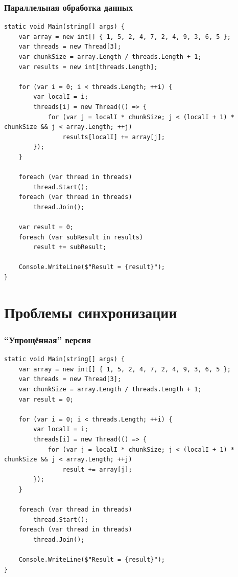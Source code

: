 \documentclass[xetex,mathserif,serif]{beamer}
\begin{document}
	\begin{frame}[fragile]
		\frametitle{Параллельная обработка данных}
		\begin{ssmall}
			\begin{verbatim}
static void Main(string[] args) {
    var array = new int[] { 1, 5, 2, 4, 7, 2, 4, 9, 3, 6, 5 };
    var threads = new Thread[3];
    var chunkSize = array.Length / threads.Length + 1;
    var results = new int[threads.Length];

    for (var i = 0; i < threads.Length; ++i) {
        var localI = i;
        threads[i] = new Thread(() => {
            for (var j = localI * chunkSize; j < (localI + 1) * chunkSize && j < array.Length; ++j)
                results[localI] += array[j];
        });
    }

    foreach (var thread in threads)
        thread.Start();
    foreach (var thread in threads)
        thread.Join();

    var result = 0;
    foreach (var subResult in results)
        result += subResult;

    Console.WriteLine($"Result = {result}");
}
			\end{verbatim}
		\end{ssmall}
	\end{frame}

	\section{Проблемы синхронизации}

	\begin{frame}[fragile]
		\frametitle{``Упрощённая'' версия}
		\begin{ssmall}
			\begin{verbatim}
static void Main(string[] args) {
    var array = new int[] { 1, 5, 2, 4, 7, 2, 4, 9, 3, 6, 5 };
    var threads = new Thread[3];
    var chunkSize = array.Length / threads.Length + 1;
    var result = 0;

    for (var i = 0; i < threads.Length; ++i) {
        var localI = i;
        threads[i] = new Thread(() => {
            for (var j = localI * chunkSize; j < (localI + 1) * chunkSize && j < array.Length; ++j)
                result += array[j];
        });
    }

    foreach (var thread in threads)
        thread.Start();
    foreach (var thread in threads)
        thread.Join();

    Console.WriteLine($"Result = {result}");
}
			\end{verbatim}
		\end{ssmall}
	\end{frame}
\end{document}
